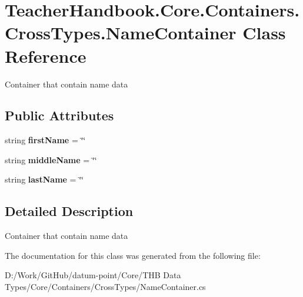 \hypertarget{class_teacher_handbook_1_1_core_1_1_containers_1_1_cross_types_1_1_name_container}{}\section{Teacher\+Handbook.\+Core.\+Containers.\+Cross\+Types.\+Name\+Container Class Reference}
\label{class_teacher_handbook_1_1_core_1_1_containers_1_1_cross_types_1_1_name_container}


Container that contain name data  


\subsection*{Public Attributes}
\begin{DoxyCompactItemize}
\item 
\mbox{\label{class_teacher_handbook_1_1_core_1_1_containers_1_1_cross_types_1_1_name_container_a25225029333995c9cf056b2a6a5eafb9}} 
string {\bfseries first\+Name} = \char`\"{}\char`\"{}
\item 
\mbox{\label{class_teacher_handbook_1_1_core_1_1_containers_1_1_cross_types_1_1_name_container_a11d62ef2b09dcf50ec4c9d1e6bb36f85}} 
string {\bfseries middle\+Name} = \char`\"{}\char`\"{}
\item 
\mbox{\label{class_teacher_handbook_1_1_core_1_1_containers_1_1_cross_types_1_1_name_container_a7427eea89f14e950f33efd2135607d4a}} 
string {\bfseries last\+Name} = \char`\"{}\char`\"{}
\end{DoxyCompactItemize}


\subsection{Detailed Description}
Container that contain name data 



The documentation for this class was generated from the following file\+:\begin{DoxyCompactItemize}
\item 
D\+:/\+Work/\+Git\+Hub/datum-\/point/\+Core/\+T\+H\+B Data Types/\+Core/\+Containers/\+Cross\+Types/Name\+Container.\+cs\end{DoxyCompactItemize}
